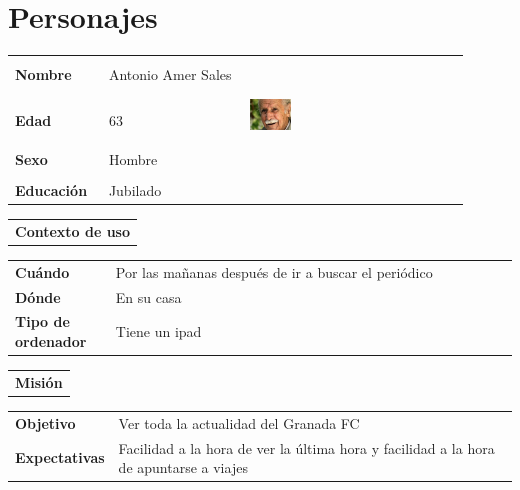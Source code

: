 \documentclass[11pt]{article}
\begin{document}
\section{Personajes}
\begin{table}[H]
  \centering
  \begin{tabular}{p{0.2\linewidth}|p{0.3\linewidth}p{0.475\linewidth}}
    \toprule
    \textbf{Nombre} & Antonio Amer Sales &\multirow{4}{*}{\begin{minipage}{1.\textwidth}\includegraphics[width=0.2\textwidth, height=30mm]{AntonioAmer}\end{minipage}}\\\\
    \textbf{Edad} & 63 & \\
    \textbf{Sexo} & Hombre & \\
    \textbf{Educación} & Jubilado & \\
    \bottomrule
  \end{tabular}

  \begin{tabular}{l}
    \textbf{Contexto de uso} 
  \end{tabular}
  
  \begin{tabular}{p{0.2\linewidth}|p{0.8\linewidth}}
    \toprule
    \textbf{Cuándo} & Por las mañanas después de ir a buscar el periódico &\\
    \textbf{Dónde}  & En su casa &\\
    \textbf{Tipo de ordenador} & Tiene un ipad &\\
    \bottomrule
  \end{tabular}

  \begin{tabular}{l}
    \textbf{Misión} 
  \end{tabular}
  
  \begin{tabular}{p{0.2\linewidth}|p{0.8\linewidth}}
    \toprule
    \textbf{Objetivo} & Ver toda la actualidad del Granada FC  &\\
    \textbf{Expectativas}  & Facilidad a la hora de ver la última hora y facilidad a la hora de apuntarse a viajes &\\
    \bottomrule
  \end{tabular}


\end{table}
\end{document}
